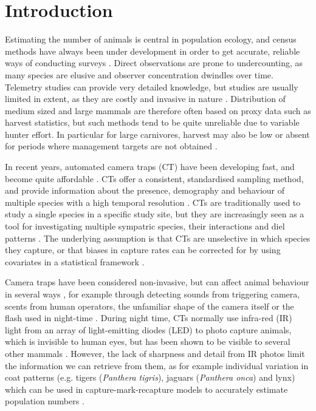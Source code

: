 \chapter{Introduction}
Estimating the number of animals is central in population ecology, and census methods have always been under development in order to get accurate, reliable ways of conducting surveys \autocite{morellet2011}.
Direct observations are prone to undercounting, as many species are elusive and observer concentration dwindles over time. Telemetry studies can provide very detailed knowledge, but studies are usually limited in extent, as they are costly and invasive in nature \autocite{Ikeda2016}. %
Distribution of medium sized and large mammals are therefore often based on proxy data such as harvest statistics, but such methods tend to be quite unreliable due to variable hunter effort. In particular for large carnivores, harvest may also be low or absent for periods where management targets are not obtained \autocite{morellet2011}.


In recent years, automated camera traps (CT) have been developing fast, and become quite affordable \autocite{Burton2015}. 
CTs offer a consistent, standardised sampling method, and provide information about the presence, demography and behaviour of multiple species with a high temporal resolution \autocite{Ikeda2016}. 
CTs are traditionally used to study a single species in a specific study site, but they are increasingly seen as a tool for investigating multiple sympatric species, their interactions and diel patterns \autocite{Ikeda2016}. 
The underlying assumption is that CTs are unselective in which species they capture, or that biases in capture rates can be corrected for by using covariates in a statistical framework \autocite{Hofmeester2019}.  


Camera traps have been considered non-invasive, but can affect animal behaviour in several ways \cite{Meek2014a}, for example through detecting sounds from triggering camera, scents from human operators, the unfamiliar shape of the camera itself or the flash used in night-time \autocite{Wegge2004,Burton2015, Beddari2019}.
During night time, CTs normally use infra-red (IR) light from an array of light-emitting diodes (LED) to photo capture animals, which is invisible to human eyes, but has been shown to be visible to several other mammals \autocite{Meek2014a, Meek2016}. 
However, the lack of sharpness and detail from IR photos limit the information we can retrieve from them, as for example individual variation in coat patterns (e.g. tigers (\textit{Panthera tigris}), jaguars (\textit{Panthera onca}) and lynx) which can be used in capture-mark-recapture models to accurately estimate population numbers \autocite{Meek2014a,Rovero2013}. 


